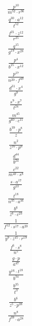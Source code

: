 \begin{align}
\frac{p^{10}}{m^{52}\cdot r^{36}}
\end{align}
\begin{align}
\frac{q^{30}\cdot a^{12}}{t^{52}}
\end{align}
\begin{align}
\frac{f^{21}\cdot z^{12}}{r^{25}}
\end{align}
\begin{align}
\frac{q^{15}}{g^{19}\cdot x^{28}}
\end{align}
\begin{align}
\frac{p^{4}}{b^{25}\cdot x^{12}}
\end{align}
\begin{align}
\frac{p^{17}}{n^{20}\cdot f^{49}}
\end{align}
\begin{align}
\frac{d^{31}\cdot x^{4}}{g^{9}}
\end{align}
\begin{align}
\frac{s^{9}\cdot x^{7}}{t^{24}}
\end{align}
\begin{align}
\frac{m^{45}}{g^{60}\cdot c^{11}}
\end{align}
\begin{align}
\frac{b^{39}\cdot p^{8}}{z}
\end{align}
\begin{align}
\frac{n^{2}}{z^{16}\cdot p^{6}}
\end{align}
\begin{align}
\frac{d^{44}}{b^{24}}
\end{align}
\begin{align}
\frac{c^{22}}{m^{40}\cdot s^{8}}
\end{align}
\begin{align}
\frac{s\cdot a^{17}}{g^{13}}
\end{align}
\begin{align}
\frac{t^{18}}{n^{35}\cdot a^{16}}
\end{align}
\begin{align}
\frac{b^{6}}{z^{6}\cdot c^{23}}
\end{align}
\begin{align}
\frac{1}{f^{12}\cdot s^{17}\cdot a^{20}}
\end{align}
\begin{align}
\frac{1}{y^{9}\cdot z^{45}\cdot r^{19}}
\end{align}
\begin{align}
\frac{f^{6}\cdot s^{8}}{n^{5}}
\end{align}
\begin{align}
\frac{g\cdot p}{a^{47}}
\end{align}
\begin{align}
\frac{y^{16}\cdot t^{18}}{b^{34}}
\end{align}
\begin{align}
\frac{b^{35}}{t^{3}}
\end{align}
\begin{align}
\frac{b^{6}}{z^{5}\cdot p^{38}}
\end{align}
\begin{align}
\frac{n^{8}}{f^{39}\cdot a^{28}}
\end{align}
